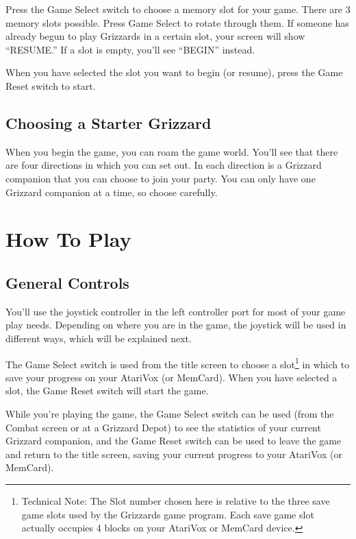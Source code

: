 \documentclass[12pt,twoside]{memoir}
\begin{document}
Press the  Game Select  switch to  choose a memory  slot for  your game.
There are 3  memory slots possible. Press Game Select  to rotate through
them. If someone has already begun  to play Grizzards in a certain slot,
your  screen will  show  ``RESUME.''  If a  slot  is  empty, you'll  see
``BEGIN'' instead.

When you have selected the slot you want to begin (or resume), press the
Game Reset switch to start.

\section{Choosing a Starter Grizzard}

When you begin  the game, you can  roam the game world.  You'll see that
there are four directions in which you can set out. In each direction is
a Grizzard  companion that you  can choose to  join your party.  You can
only have one Grizzard companion at a time, so choose carefully.

\chapter{How To Play}

\section{General Controls}

You'll use the joystick controller in the left controller port for most of
your game play needs. Depending on where you are in the game, the joystick
will be used in different ways, which will be explained next.

The  Game  Select  switch  is  used from  the  title  screen  to  choose
a slot\footnote{Technical Note: The Slot  number chosen here is relative
  to  the three  save game  slots used  by the  Grizzards game  program.
  Each save  game slot actually  occupies 4  blocks on your  AtariVox or
  MemCard device.} in  which to save your progress on  your AtariVox (or
MemCard). When  you have  selected a  slot, the  Game Reset  switch will
start the game.

While you're playing the game, the Game Select switch can be used (from the
Combat screen or at a Grizzard Depot) to see the statistics of your current
Grizzard companion, and the Game Reset switch can be used to leave the game
and return to the title screen, saving your current progress to your
AtariVox (or MemCard).
\end{document}
